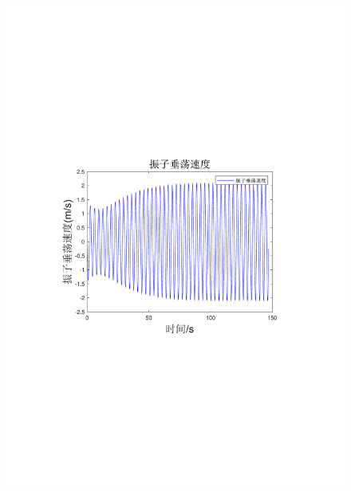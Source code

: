 \documentclass[12pt,utf8]{article}
\begin{document}
\begin{figure}[htbp]
\begin{minipage}{0.45\linewidth}
		\includegraphics[width=0.9\linewidth]{figures/振子垂荡速度.pdf}
	\end{minipage}
	\begin{minipage}{0.45\linewidth}

\end{minipage}
\end{figure}
\end{document}
